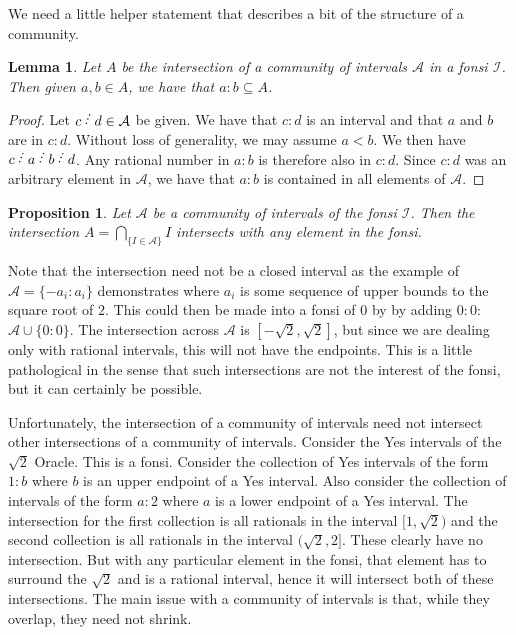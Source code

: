 \documentclass[12pt]{article}
\newtheorem{lemma}{Lemma}[subsection]
\newtheorem{proposition}{Proposition}[subsection]
\begin{document}
We need a little helper statement that describes a bit of the structure of a community.

\begin{lemma}
    Let $A$ be the intersection of a community of intervals $\mathcal{A}$ in a fonsi $\mathcal{I}$. Then given $a, b \in A$, we have that $a : b \subseteq A$.
\end{lemma}

\begin{proof}
    Let $c\lte d \in \mathcal{A}$ be given. We have that $c:d$ is an interval and that $a$ and $b$ are in $c:d$. Without loss of generality, we may assume $a < b$.  We then have $c \lte a \lte b \lte d$. Any rational number in $a:b$ is therefore also in $c:d$. Since $c:d$ was an arbitrary element in $\mathcal{A}$, we have that $a:b$ is contained in all elements of $\mathcal{A}$.
\end{proof}

\begin{proposition}\label{pr:fonsi-inf-inter}
Let $\mathcal{A}$ be a community of intervals of the fonsi $\mathcal{I}$. Then the intersection $A = \bigcap_{\{ I \in \mathcal{A}\}} I $ intersects with any element in the fonsi. 
\end{proposition}


Note that the intersection need not be a closed interval as the example of $\mathcal{A} = \{ -a_i : a_i \}$ demonstrates where $a_i$ is some sequence of upper bounds to the square root of $2$. This could then be made into a fonsi of 0 by by adding $0:0$:  $\mathcal{A} \cup \{0:0\}$. The intersection across $\mathcal{A}$ is $[-\sqrt{2}, \sqrt{2}]$, but since we are dealing only with rational intervals, this will not have the endpoints. This is a little pathological in the sense that such intersections are not the interest of the fonsi, but it can certainly be possible. 

Unfortunately, the intersection of a community of intervals need not intersect other intersections of a community of intervals. Consider the Yes intervals of the $\sqrt{2}$ Oracle. This is a fonsi. Consider the collection of Yes intervals of the form $1:b$ where $b$ is an upper endpoint of a Yes interval. Also consider the collection of intervals of the form $a:2$ where $a$ is a lower endpoint of a Yes interval. The intersection for the first collection is all rationals in the interval $[1, \sqrt{2})$ and the second collection is all rationals in the interval $(\sqrt{2}, 2]$. These clearly have no intersection. But with any particular element in the fonsi, that element has to surround the $\sqrt{2}$ and is a rational interval, hence it will intersect both of these intersections. The main issue with a community of intervals is that, while they overlap, they need not shrink. 
\end{document}
